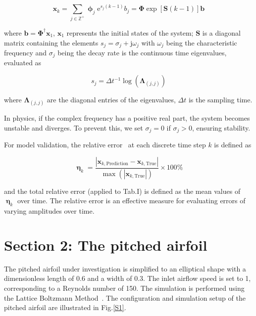 \begin{equation}
    \mathbf{x}_{k}=\sum\limits_{j\in \mathbb{Z}^{+}}{{\bm{\upphi}_{j}}{\text{e}^{{{s}_{j}}(k-1)}}{{b}_{j}}}=\mathbf{\Phi}\exp [\mathbf{S}(k-1)]\mathbf{b} \label{eqS16}
\end{equation}

\noindent where $\mathbf{b}={\mathbf{\Phi}^{\dagger}}{\mathbf{x}_{1}}$, ${\mathbf{x}_{1}}$ represents the initial states of the system; $\mathbf{S}$ is a diagonal matrix containing the elements ${s}_{j}={\sigma_{j}}+\text{j}{\omega_{j}}$ with ${\omega_{j}}$ being the characteristic frequency and ${\sigma_{j}}$ being the decay rate is the continuous time eigenvalues, evaluated as 

\begin{equation}
    {s}_{j}=\Delta {t}^{-1}\log ({\mathbf{\Lambda}_{(j,j)}}) \label{eqS15}
\end{equation}

\noindent where $\mathbf{\Lambda}_{(j,j)}$ are the diagonal entries of the eigenvalues, $\Delta t$ is the sampling time.

In physics, if the complex frequency has a positive real part, the system becomes unstable and diverges. To prevent this, we set ${\sigma_{j}}=0$ if ${\sigma_{j}}>0$, ensuring stability.

For model validation, the relative error~\cite{tofallis2015better} at each discrete time step $k$ is defined as

\begin{equation}
    \bm{\upeta}_{k}=\frac{\left| \mathbf{x}_{k,\text{Prediction}}-\mathbf{x}_{k,\text{True}} \right|}{\max (\left| \mathbf{x}_{k,\text{True}} \right|)}\times 100\%  \label{eqS17}
\end{equation}

\noindent and the total relative error (applied to Tab.I) is defined as the mean values of $\bm{\upeta}_{k}$ over time. The relative error is an effective measure for evaluating errors of varying amplitudes over time. 


\section{Section 2: The pitched airfoil}
The pitched airfoil under investigation is simplified to an elliptical shape with a dimensionless length of 0.6 and a width of 0.3. The inlet airflow speed is set to 1, corresponding to a Reynolds number of 150. The simulation is performed using the Lattice Boltzmann Method~\cite{aidun2010lattice}. The configuration and simulation setup of the pitched airfoil are illustrated in Fig.\ref{S1}.

